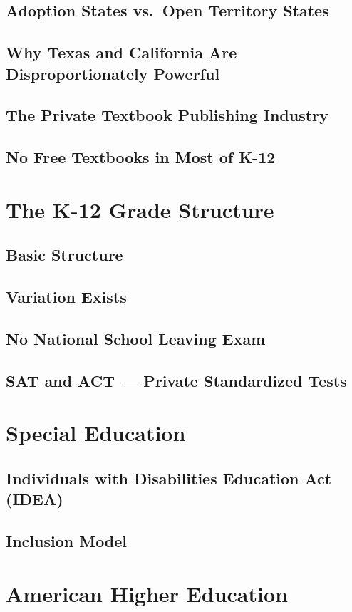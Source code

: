 \subsection{Adoption States vs.\ Open Territory States}
\subsection{Why Texas and California Are Disproportionately Powerful}
\subsection{The Private Textbook Publishing Industry}
\subsection{No Free Textbooks in Most of K-12}

\section{The K-12 Grade Structure}
\subsection{Basic Structure}
\subsection{Variation Exists}
\subsection{No National School Leaving Exam}
\subsection{SAT and ACT --- Private Standardized Tests}

\section{Special Education}
\subsection{Individuals with Disabilities Education Act (IDEA)}
\subsection{Inclusion Model}

\section{American Higher Education}
